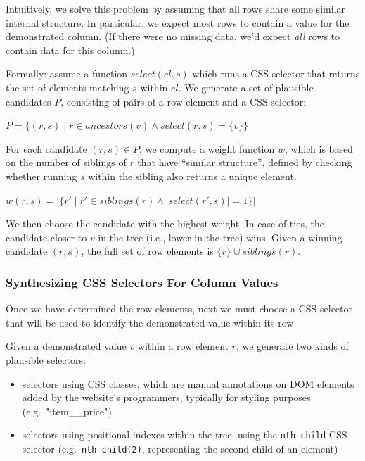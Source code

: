 \documentclass[sigconf,10pt]{acmart}
\providecommand{\tightlist}{%
  \setlength{\itemsep}{0pt}\setlength{\parskip}{0pt}}
\begin{document}
Intuitively, we solve this problem by assuming that all rows share some
similar internal structure. In particular, we expect most rows to
contain a value for the demonstrated column. (If there were no missing
data, we'd expect \emph{all} rows to contain data for this column.)

Formally: assume a function \(select(el, s)\) which runs a CSS selector
that returns the set of elements matching \(s\) within \(el\). We
generate a set of plausible candidates \(P\), consisting of pairs of a
row element and a CSS selector:

\(P = \{ (r, s) \mid r \in ancestors(v) \land select(r, s) = \{v\} \}\)

For each candidate \((r, s) \in P\), we compute a weight function \(w\),
which is based on the number of siblings of \(r\) that have ``similar
structure'', defined by checking whether running \(s\) within the
sibling also returns a unique element.

\(w(r, s) = |\{ r' \mid r' \in siblings(r) \land |select(r', s) | = 1 \}|\)

We then choose the candidate with the highest weight. In case of ties,
the candidate closer to \(v\) in the tree (i.e., lower in the tree)
wins. Given a winning candidate \((r, s)\), the full set of row elements
is \(\{r\} \cup siblings(r)\).

\hypertarget{synthesizing-css-selectors-for-column-values}{%
\subsubsection*{Synthesizing CSS Selectors For Column
Values}\label{synthesizing-css-selectors-for-column-values}}

Once we have determined the row elements, next we must choose a CSS
selector that will be used to identify the demonstrated value within its
row.

Given a demonstrated value \(v\) within a row element \(r\), we generate
two kinds of plausible selectors:

\begin{itemize}
\tightlist
\item
  selectors using CSS classes, which are manual annotations on DOM
  elements added by the website's programmers, typically for styling
  purposes (e.g.~"item\_\_price")
\item
  selectors using positional indexes within the tree, using the
  \texttt{nth-child} CSS selector (e.g.~\texttt{nth-child(2)},
  representing the second child of an element)
\end{itemize}
\end{document}
